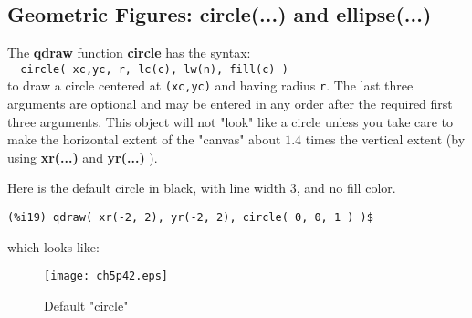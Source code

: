 \documentclass[12pt]{article}
\begin{document}
\subsection{Geometric Figures: circle(...) and ellipse(...) }
The \textbf{qdraw} function \textbf{circle} has the syntax:\\
  \verb|  circle( xc,yc, r, lc(c), lw(n), fill(c) ) | \\
  to draw a circle centered at \verb|(xc,yc)| and having radius \verb|r|.
The last three arguments are optional and may be entered in any order after
  the required first three arguments.
 \smallskip
This object will not "look" like a circle unless you take care to make the
  horizontal extent of the "canvas" about $1.4$ times the vertical extent
  (by using \textbf{xr(...)} and \textbf{yr(...)} ).

\smallskip
Here is the default circle in black, with line width 3, and no fill color.
\small
\begin{verbatim}
(%i19) qdraw( xr(-2, 2), yr(-2, 2), circle( 0, 0, 1 ) )$
\end{verbatim}
\normalsize
%
which looks like:
\begin{figure} [h]
   \centerline{\texttt{[image: ch5p42.eps]} }
	\caption{Default "circle"}
\end{figure}      
\end{document}
